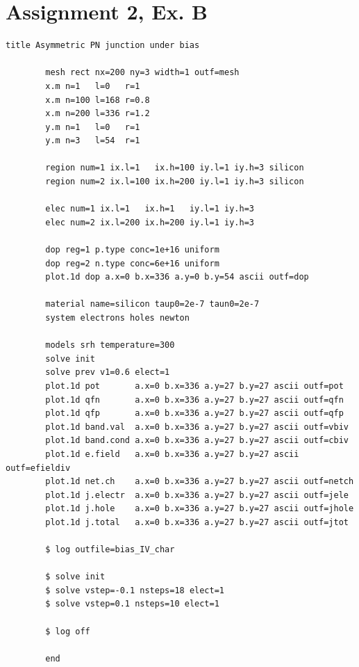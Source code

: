 \documentclass{book}
\begin{document}
        \section*{Assignment 2, Ex. B}
        \begin{Verbatim}[gobble=4]
        title Asymmetric PN junction under bias 

        mesh rect nx=200 ny=3 width=1 outf=mesh
        x.m n=1   l=0   r=1
        x.m n=100 l=168 r=0.8
        x.m n=200 l=336 r=1.2
        y.m n=1   l=0   r=1
        y.m n=3   l=54  r=1

        region num=1 ix.l=1   ix.h=100 iy.l=1 iy.h=3 silicon
        region num=2 ix.l=100 ix.h=200 iy.l=1 iy.h=3 silicon

        elec num=1 ix.l=1   ix.h=1   iy.l=1 iy.h=3
        elec num=2 ix.l=200 ix.h=200 iy.l=1 iy.h=3

        dop reg=1 p.type conc=1e+16 uniform
        dop reg=2 n.type conc=6e+16 uniform
        plot.1d dop a.x=0 b.x=336 a.y=0 b.y=54 ascii outf=dop

        material name=silicon taup0=2e-7 taun0=2e-7
        system electrons holes newton

        models srh temperature=300
        solve init
        solve prev v1=0.6 elect=1
        plot.1d pot       a.x=0 b.x=336 a.y=27 b.y=27 ascii outf=pot
        plot.1d qfn       a.x=0 b.x=336 a.y=27 b.y=27 ascii outf=qfn
        plot.1d qfp       a.x=0 b.x=336 a.y=27 b.y=27 ascii outf=qfp
        plot.1d band.val  a.x=0 b.x=336 a.y=27 b.y=27 ascii outf=vbiv
        plot.1d band.cond a.x=0 b.x=336 a.y=27 b.y=27 ascii outf=cbiv
        plot.1d e.field   a.x=0 b.x=336 a.y=27 b.y=27 ascii outf=efieldiv
        plot.1d net.ch    a.x=0 b.x=336 a.y=27 b.y=27 ascii outf=netch
        plot.1d j.electr  a.x=0 b.x=336 a.y=27 b.y=27 ascii outf=jele
        plot.1d j.hole    a.x=0 b.x=336 a.y=27 b.y=27 ascii outf=jhole
        plot.1d j.total   a.x=0 b.x=336 a.y=27 b.y=27 ascii outf=jtot

        $ log outfile=bias_IV_char

        $ solve init
        $ solve vstep=-0.1 nsteps=18 elect=1
        $ solve vstep=0.1 nsteps=10 elect=1

        $ log off

        end 
        \end{Verbatim}
            
\end{document}
